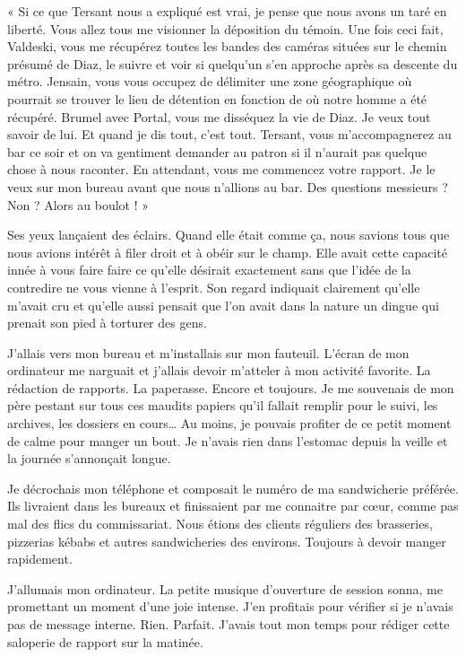 « Si ce que Tersant nous a expliqué est vrai, je pense que nous avons un taré en liberté. Vous allez tous me visionner 
la déposition du témoin. Une fois ceci fait, Valdeski, vous me récupérez toutes les bandes des caméras situées sur le 
chemin présumé de Diaz, le suivre et voir si quelqu'un s'en approche après sa descente du métro. Jensain, vous vous 
occupez de délimiter une zone géographique où pourrait se trouver le lieu de détention en fonction de où notre homme a 
été récupéré. Brumel avec Portal, vous me disséquez la vie de Diaz. Je veux tout savoir de lui. Et quand je dis tout, 
c'est tout. Tersant, vous m'accompagnerez au bar ce soir et on va gentiment demander au patron si il n'aurait pas 
quelque chose à nous raconter. En attendant, vous me commencez votre rapport. Je le veux sur mon bureau avant que nous 
n'allions au bar. Des questions messieurs ? Non ? Alors au boulot ! »

Ses yeux lançaient des éclairs. Quand elle était comme ça, nous savions tous que nous avions intérêt à filer droit et à
obéir sur le champ. Elle avait cette capacité innée à vous faire faire ce qu'elle désirait exactement sans que l'idée 
de la contredire ne vous vienne à l'esprit. Son regard indiquait clairement qu'elle m'avait cru et qu'elle aussi 
pensait que l'on avait dans la nature un dingue qui prenait son pied à torturer des gens.

J'allais vers mon bureau et m'installais sur mon fauteuil. L'écran de mon ordinateur me narguait et j'allais devoir 
m'atteler à mon activité favorite. La rédaction de rapports. La paperasse. Encore et toujours. Je me souvenais de 
mon père pestant sur tous ces maudits papiers qu'il fallait remplir pour le suivi, les archives, les dossiers en 
cours… Au moins, je pouvais profiter de ce petit moment de calme pour manger un bout. Je n'avais rien dans l'estomac 
depuis la veille et la journée s'annonçait longue.

Je décrochais mon téléphone et composait le numéro de ma sandwicherie préférée. Ils livraient dans les bureaux et 
finissaient par me connaitre par cœur, comme pas mal des flics du commissariat. Nous étions des clients réguliers des 
brasseries, pizzerias kébabs et autres sandwicheries des environs. Toujours à devoir manger rapidement.

J'allumais mon ordinateur. La petite musique d'ouverture de session sonna, me promettant un moment d'une joie intense. 
J'en profitais pour vérifier si je n'avais pas de message interne. Rien. Parfait. J'avais tout mon temps pour rédiger 
cette saloperie de rapport sur la matinée.

